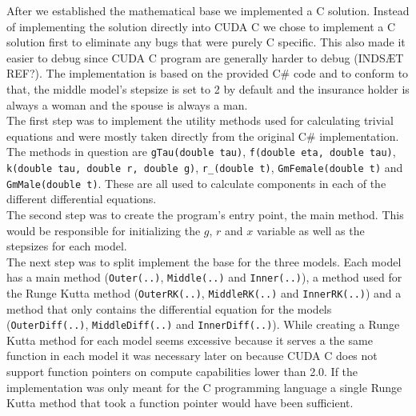
After we established the mathematical base we implemented a C solution. Instead of implementing the solution directly into CUDA C we chose to implement a C solution first to eliminate any bugs that were purely C specific. This also made it easier to debug since CUDA C program are generally harder to debug (INDSÆT REF?). The implementation is based on the provided C\# code and to conform to that, the middle model's stepsize is set to 2 by default and the insurance holder is always a woman and the spouse is always a man.\\

The first step was to implement the utility methods used for calculating trivial equations and were mostly taken directly from the original C\# implementation. The methods in question are \texttt{gTau(double tau)}, \texttt{f(double eta, double tau)}, \texttt{k(double tau, double r, double g)}, \texttt{r\_(double t)}, \texttt{GmFemale(double t)} and \texttt{GmMale(double t)}. These are all used to calculate components in each of the different differential equations. \\

The second step was to create the program's entry point, the main method. This would be responsible for initializing the $g$, $r$ and $x$ variable as well as the stepsizes for each model. \\

The next step was to split implement the base for the three models. Each model has a main method (\texttt{Outer(..)}, \texttt{Middle(..)} and \texttt{Inner(..)}), a method used for the Runge Kutta method (\texttt{OuterRK(..)}, \texttt{MiddleRK(..)} and \texttt{InnerRK(..)}) and a method that only contains the differential equation for the models (\texttt{OuterDiff(..)}, \texttt{MiddleDiff(..)} and \texttt{InnerDiff(..)}). While creating a Runge Kutta method for each model seems excessive because it serves a the same function in each model it was necessary later on because CUDA C does not support function pointers on compute capabilities lower than 2.0. If the implementation was only meant for the C programming language a single Runge Kutta method that took a function pointer would have been sufficient. \\

